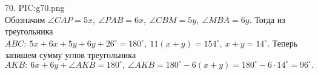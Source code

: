70. {{PIC:g70.png}}\\
Обозначим $\angle CAP=5x,\ \angle PAB=6x,\ \angle CBM=5y,\ \angle MBA=6y.$ Тогда из треугольника $ABC:\ 5x+6x+5y+6y+26^\circ=180^\circ,\ 11(x+y)=154^\circ,\ x+y=14^\circ.$ Теперь запишем сумму углов треугольника $AKB:\ 6x+6y+\angle AKB=180^\circ,\ \angle AKB=180^\circ-6(x+y)=180^\circ-6\cdot14^\circ=96^\circ.$\\
